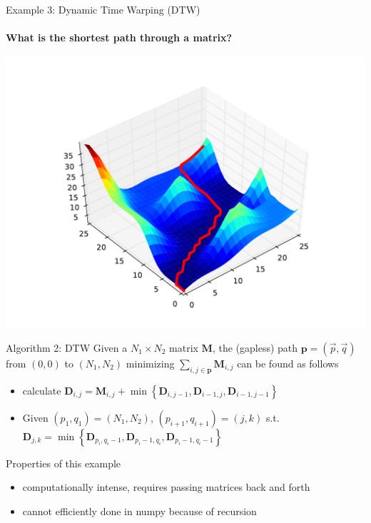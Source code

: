 \documentclass[german]{beamer}
\begin{document}
\begin{frame}{Example 3: Dynamic Time Warping (DTW)}
  \framesubtitle{What is the shortest path through a matrix?}
 
  \begin{minipage}{.43\textwidth}
    \hspace{-1.5cm}
    \includegraphics[width=1.5\textwidth]{pics/dtwexample}
  \end{minipage}
  \hfill
  \begin{minipage}{.55\textwidth}
    \begin{block}{Algorithm 2: DTW}
      Given a $N_1 \times N_2$ matrix $\mathbf{M}$, the (gapless) path $\mathbf{p}=(\vec{p},\vec{q})$
      from $(0,0)$ to $(N_1,N_2)$ minimizing $\sum_{i,j\in
        \mathbf{p}}{\mathbf{M}_{i,j}}$ can be found as follows
      \begin{itemize}
      \item calculate
        $\mathbf{D}_{i,j}=\mathbf{M}_{i,j}+\min{\left\{\mathbf{D}_{i,j-1},\mathbf{D}_{i-1,j},\mathbf{D}_{i-1,j-1}\right\}}$
      \item Given $(p_1, q_1)=(N_1,N_2)$, $(p_{i+1},q_{i+1}) = (j,k)$
        s.t.$ \mathbf{D}_{j,k}=\min\left\{ \mathbf{D}_{p_i,q_i-1},
        \mathbf{D}_{p_i-1,q_i},  \mathbf{D}_{p_i-1,q_i-1} \right\}$
      \end{itemize}
    \end{block}
  \end{minipage}
  \begin{block}{Properties of this example}
    \begin{itemize}
    \item computationally intense, requires passing
      matrices back and forth
    \item cannot efficiently done in numpy because of recursion
    \end{itemize}
  \end{block}
\end{frame}
\end{document}
